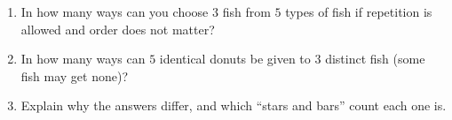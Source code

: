 \begin{enumerate}
\item In how many ways can you choose $3$ fish from $5$ types of fish if repetition is allowed and order does not matter?
\item In how many ways can $5$ identical donuts be given to $3$ distinct fish (some fish may get none)?
\item Explain why the answers differ, and which ``stars and bars'' count each one is.
\end{enumerate}
